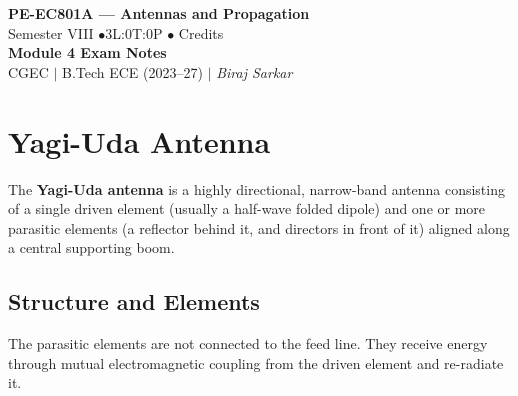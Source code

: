 \documentclass[12pt,a4paper]{article}
\begin{document}

\begin{center}
  {\LARGE\bfseries\color{myred} PE-EC801A --- Antennas and Propagation}\\[5pt]
  {\normalsize\color{mydark} Semester VIII \quad$\bullet$\quad 3L:0T:0P \quad$\bullet$ Credits}\\[3pt]
  {\normalsize\color{myteal}\textbf{Module 4 Exam Notes}}\\[3pt]
  {\small\color{mydark} CGEC \;$|$\; B.Tech ECE (2023--27) \;$|$\; \textit{Biraj Sarkar}}
\end{center}
\vspace{2pt}
\noindent{\color{myred}\rule{\linewidth}{1.5pt}}
\vspace{2pt}

\hypersetup{linkcolor=mydark}
\tableofcontents
\hypersetup{linkcolor=myteal}
\newpage

\section{Yagi-Uda Antenna}

\begin{tcolorbox}[defbox, title={\textbf{Definition of Yagi-Uda Antenna}}]
The \textbf{Yagi-Uda antenna} is a highly directional, narrow-band antenna consisting of a single driven element (usually a half-wave folded dipole) and one or more parasitic elements (a reflector behind it, and directors in front of it) aligned along a central supporting boom.
\end{tcolorbox}

\subsection{Structure and Elements}
The parasitic elements are not connected to the feed line. They receive energy through mutual electromagnetic coupling from the driven element and re-radiate it.
\end{document}
